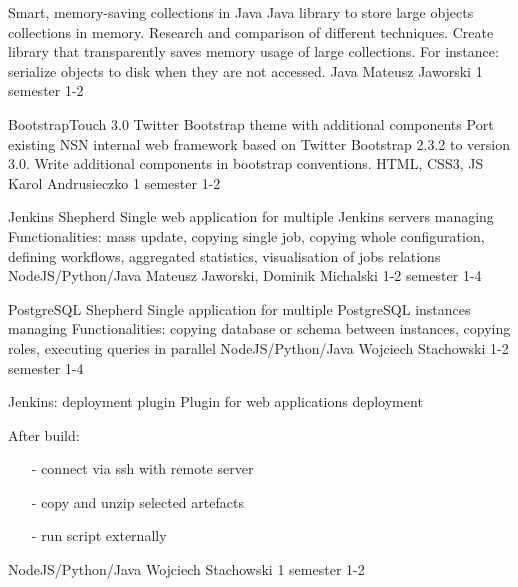 \begin{project}
{Smart, memory-saving collections in Java}
{Java library to store large objects collections in memory. Research and comparison of different techniques.} 
{ 
Create library that transparently saves memory usage of large collections. For instance: serialize objects to disk when they are not accessed.
}
{Java}
{Mateusz Jaworski}
{1 semester}
{1-2}
\end{project}
\begin{project}
{BootstrapTouch 3.0}
{Twitter Bootstrap theme with additional components} 
{ 
Port existing NSN internal web framework based on Twitter Bootstrap 2.3.2 to version 3.0. Write additional components in bootstrap conventions.
}
{HTML, CSS3, JS}
{Karol Andrusieczko}
{1 semester}
{1-2}
\end{project}
\begin{project}
{Jenkins Shepherd}
{Single web application for multiple Jenkins servers managing} 
{ 
Functionalities: mass update, copying single job, copying whole configuration, defining workflows, aggregated statistics, visualisation of jobs relations
}
{NodeJS/Python/Java}
{Mateusz Jaworski, Dominik Michalski}
{1-2 semester}
{1-4}
\end{project}
\begin{project}
{PostgreSQL Shepherd}
{Single application for multiple PostgreSQL instances managing} 
{ 
Functionalities: copying database or schema between instances, copying roles, executing queries in parallel
}
{NodeJS/Python/Java}
{Wojciech Stachowski}
{1-2 semester}
{1-4}
\end{project}
\begin{project}
{Jenkins: deployment plugin}
{Plugin for web applications deployment} 
{ 
After build:
\begin{itemize}
\item[-] connect via ssh with remote server
\item[-] copy and unzip selected artefacts
\item[-] run script externally
\end{itemize}
}
{NodeJS/Python/Java}
{Wojciech Stachowski}
{1 semester}
{1-2}
\end{project}
